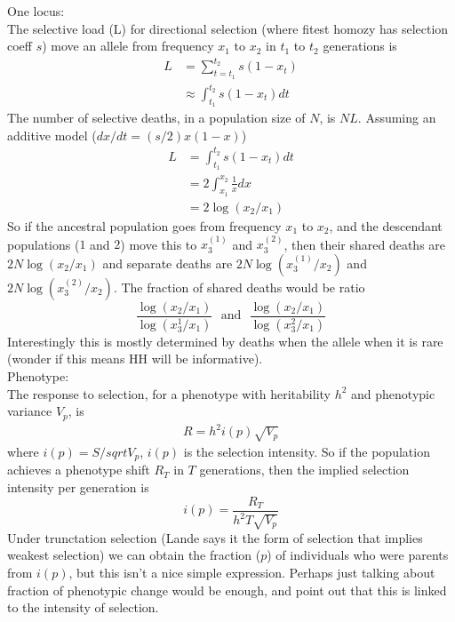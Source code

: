 \documentclass[a4paper,10pt]{article}
\begin{document}
One locus:\\
The selective load (L) for directional selection (where fitest homozy
has selection coeff $s$) move an allele from frequency $x_1$ to $x_2$
in $t_1$ to $t_2$ generations is
\begin{align}
L &= \sum_{t=t_1}^{t_2} s(1-x_t) \\
&\approx \int_{t_1}^{t_2}  s(1-x_t) dt
\end{align}
The number of selective deaths, in a population size of $N$, is
$NL$. Assuming an additive model ($dx/dt = (s/2)x(1-x)$) 
\begin{align}
L &= \int_{t_1}^{t_2}  s(1-x_t) dt\\
&= 2  \int_{x_1}^{x_2}  \frac{1}{x} dx\\
& = 2 \log(x_2/x_1) 
\end{align}
So if the ancestral population goes from frequency $x_1$ to $x_2$, and
the descendant populations ($1$ and $2$) move this to $x_3^{(1)}$ and
$x_3^{(2)}$, then their shared deaths are $2N\log(x_2/x_1)$ and separate
deaths are $2N\log(x_3^{(1)}/x_2)$ and
$2N\log(x_3^{(2)}/x_2)$. The fraction of shared deaths would be ratio
\begin{equation}
\frac{\log(x_2/x_1)}{\log(x_3^{1}/x_1)}~~~\textrm{and}~~~\frac{\log(x_2/x_1)}{\log(x_3^{2}/x_1)}
\end{equation}
Interestingly this is mostly determined by deaths when the
allele when it is rare (wonder if this means HH will be informative).\\

Phenotype:\\
The response to selection, for a phenotype with heritability $h^2$ and
phenotypic variance $V_p$, is 
\begin{align}
R = h^2 i(p) \sqrt{V_p}
\end{align}
where $i(p)=S/sqrt{V_p}$, $i(p)$ is the selection intensity. So if the
population achieves a phenotype shift $R_T$ in $T$ generations, then
the implied selection intensity per generation is 
\begin{equation}
i(p) = \frac{R_T}{h^2 T \sqrt{V_p}}
\end{equation}  
Under trunctation selection (Lande says it the form of selection that
implies weakest selection) we can obtain the fraction ($p$) of individuals
who were parents from $i(p)$, but this isn't a nice simple
expression. Perhaps just talking about fraction of phenotypic change would be
enough, and point out that this is linked to the intensity of
selection. 
\end{document}
